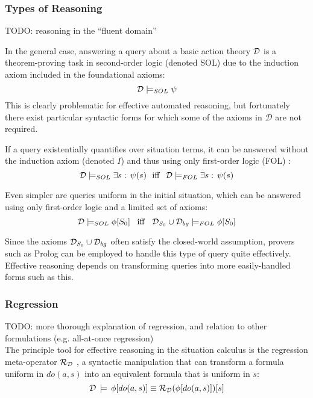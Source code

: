 \subsubsection{Types of Reasoning}

TODO: reasoning in the {}``fluent domain''

In the general case, answering a query about a basic action theory
$\mathcal{D}$ is a theorem-proving task in second-order logic (denoted SOL)
due to the induction axiom included in the foundational axioms:\[
\mathcal{D}\models_{SOL}\psi\]
 This is clearly problematic for effective automated reasoning, but
fortunately there exist particular syntactic forms for which some
of the axioms in $\mathcal{D}$ are not required.

If a query existentially quantifies over situation terms, it can be
answered without the induction axiom (denoted $I$) and thus using
only first-order logic (FOL) \citep{pirri99contributions_sitcalc}:\[
\mathcal{D}\models_{SOL}\exists s:\,\psi(s)\,\,\,\,\mathrm{iff}\,\,\,\,\mathcal{D}\models_{FOL}\exists s:\,\psi(s)\]


Even simpler are queries uniform in the initial situation, which can
be answered using only first-order logic and a limited set of axioms:\[
\mathcal{D}\models_{SOL}\phi[S_{0}]\,\,\,\,\,\mathit{\mathrm{iff}}\,\,\,\,\,\mathcal{D}_{S_{0}}\cup\mathcal{D}_{bg}\models_{FOL}\phi[S_{0}]\]


Since the axioms $\mathcal{D}_{S_{0}}\cup\mathcal{D}_{bg}$ often satisfy the closed-world
assumption, provers such as Prolog can be employed to handle this
type of query quite effectively. Effective reasoning depends on transforming
queries into more easily-handled forms such as this. \\



\subsubsection{Regression}

TODO: more thorough explanation of regression, and relation to other
formulations (e.g. all-at-once regression)\\


The principle tool for effective reasoning in the situation calculus
is the regression meta-operator $\mathcal{R}_{\mathcal{D}}$ \citep{pirri99contributions_sitcalc},
a syntactic manipulation that can transform a formula uniform in $do(a,s)$
into an equivalent formula that is uniform in $s$:\[
\mathcal{D}\,\models\,\phi[do(a,s)]\equiv\mathcal{R}_{\mathcal{D}}(\phi[do(a,s)])[s]\]


